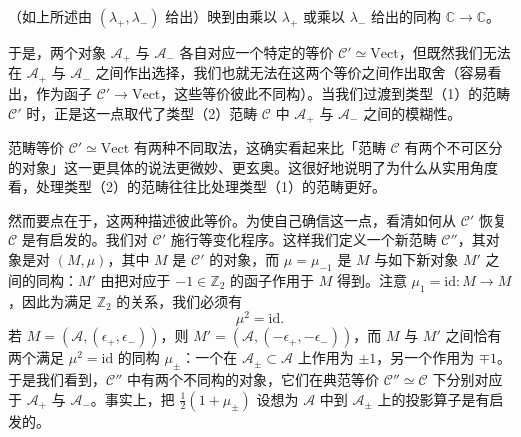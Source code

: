 \documentclass[11pt,a4paper]{article}
\begin{document}

（如上所述由 $(\lambda_+,\lambda_-)$ 给出）映到由乘以 $\lambda_+$ 或乘以 $\lambda_-$ 给出的同构 $\mathbb{C}\to\mathbb{C}$。

于是，两个对象 $\mathcal{A}_+$ 与 $\mathcal{A}_-$ 各自对应一个特定的等价 $\mathcal{C}'\simeq\mathrm{Vect}$，但既然我们无法在 $\mathcal{A}_+$ 与 $\mathcal{A}_-$ 之间作出选择，我们也就无法在这两个等价之间作出取舍（容易看出，作为函子 $\mathcal{C}'\to\mathrm{Vect}$，这些等价彼此不同构）。当我们过渡到类型（1）的范畴 $\mathcal{C}'$ 时，正是这一点取代了类型（2）范畴 $\mathcal{C}$ 中 $\mathcal{A}_+$ 与 $\mathcal{A}_-$ 之间的模糊性。

范畴等价 $\mathcal{C}'\simeq\mathrm{Vect}$ 有两种不同取法，这确实看起来比「范畴 $\mathcal{C}$ 有两个不可区分的对象」这一更具体的说法更微妙、更玄奥。这很好地说明了为什么从实用角度看，处理类型（2）的范畴往往比处理类型（1）的范畴更好。

然而要点在于，这两种描述彼此等价。为使自己确信这一点，看清如何从 $\mathcal{C}'$ 恢复 $\mathcal{C}$ 是有启发的。我们对 $\mathcal{C}'$ 施行等变化程序。这样我们定义一个新范畴 $\mathcal{C}''$，其对象是对 $(M,\mu)$，其中 $M$ 是 $\mathcal{C}'$ 的对象，而 $\mu = \mu_{-1}$ 是 $M$ 与如下新对象 $M'$ 之间的同构：$M'$ 由把对应于 $-1\in\mathbb{Z}_2$ 的函子作用于 $M$ 得到。注意 $\mu_1 = \mathrm{id} : M\to M$，因此为满足 $\mathbb{Z}_2$ 的关系，我们必须有
\[
\mu^2 = \mathrm{id}.
\]
若 $M = (\mathcal{A},(\epsilon_+,\epsilon_-))$，则 $M' = (\mathcal{A},(-\epsilon_+,-\epsilon_-))$，而 $M$ 与 $M'$ 之间恰有两个满足 $\mu^2 = \mathrm{id}$ 的同构 $\mu_\pm$：一个在 $\mathcal{A}_\pm\subset\mathcal{A}$ 上作用为 $\pm1$，另一个作用为 $\mp1$。于是我们看到，$\mathcal{C}''$ 中有两个不同构的对象，它们在典范等价 $\mathcal{C}''\simeq\mathcal{C}$ 下分别对应于 $\mathcal{A}_+$ 与 $\mathcal{A}_-$。事实上，把 $\frac{1}{2}(1+\mu_\pm)$ 设想为 $\mathcal{A}$ 中到 $\mathcal{A}_\pm$ 上的投影算子是有启发的。

\end{document}
